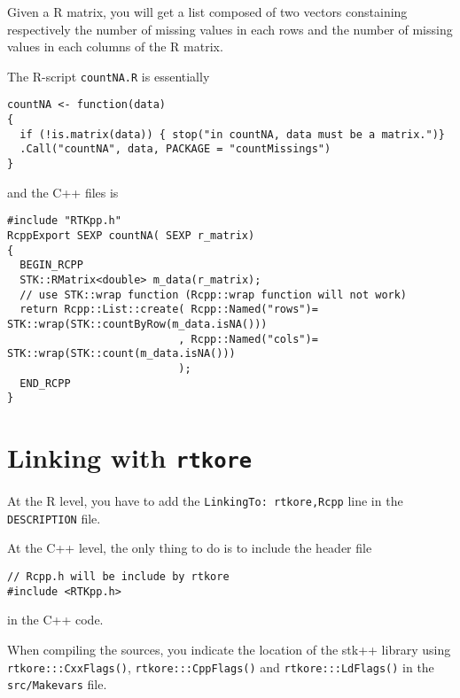 \documentclass[a4paper,10pt]{article}
\newcommand{\rtkore}{{\tt rtkore}} %
\begin{document}
Given a R matrix, you will get a list composed of two vectors
constaining respectively the number of missing values in each rows and the
number of missing values in each columns of the R matrix.

The R-script \texttt{countNA.R} is essentially
\begin{lstlisting}[style=customcpp]
countNA <- function(data)
{
  if (!is.matrix(data)) { stop("in countNA, data must be a matrix.")}
  .Call("countNA", data, PACKAGE = "countMissings")
}
\end{lstlisting}
and the C++ files is
\begin{lstlisting}[style=customcpp]
#include "RTKpp.h"
RcppExport SEXP countNA( SEXP r_matrix)
{
  BEGIN_RCPP
  STK::RMatrix<double> m_data(r_matrix);
  // use STK::wrap function (Rcpp::wrap function will not work)
  return Rcpp::List::create( Rcpp::Named("rows")= STK::wrap(STK::countByRow(m_data.isNA()))
                           , Rcpp::Named("cols")= STK::wrap(STK::count(m_data.isNA()))
                           );
  END_RCPP
}
\end{lstlisting}

\section{Linking with \rtkore{}}

At the R level, you have to add the \texttt{LinkingTo: rtkore,Rcpp} line in the
\verb+DESCRIPTION+ file.

\noindent At the C++ level, the only thing to do is to include the header file
\begin{lstlisting}[style=customcpp]
// Rcpp.h will be include by rtkore
#include <RTKpp.h>
\end{lstlisting}
in the C++ code.

When compiling the sources, you indicate the location of the stk++ library using
\verb+rtkore:::CxxFlags()+, \verb+rtkore:::CppFlags()+ and
\verb+rtkore:::LdFlags()+ in the \texttt{src/Makevars} file.
\end{document}
